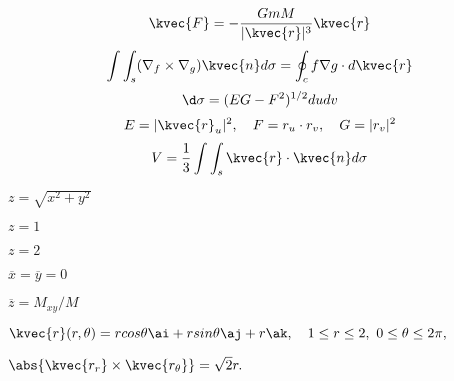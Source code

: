 \[\kvec{F}=-\frac{GmM}{|\kvec{r}|^{3}}\kvec{r}\]
\[\int\int_{s}(\nabla_{f}\times\nabla_{g})\kvec{n}d\sigma=\oint_{c}f\nabla g\cdot d\kvec{r}\]
\[\d\sigma=(EG-F^{2})^{1/2}dudv\]
\[E=|\kvec{r}_{u}|^{2},\quad F=r_{u}\cdot r_{v},\quad G=|r_{v}|^{2}\]
\[V=\frac{1}{3}\int\int_{s}\kvec{r}\cdot\kvec{n}d\sigma\]










































































\(	z=\sqrt{x^{2}+y^{2}}	\)

\(	z=1	\)

\(	z=2	\)

\(	\overline{x}=\overline{y}=0	\)

\(	\overline{z}=M_{xy}/M	\)

\(	\kvec{r}(r , \theta)=rcos\theta\ai+rsin\theta\aj+r\ak,\quad1\leq{r}\leq2,\,\,0\leq\theta\leq2\pi,	\)

\(	\abs{\kvec{r_r}\times\kvec{r_\theta}}=\sqrt{2}r.	\)


